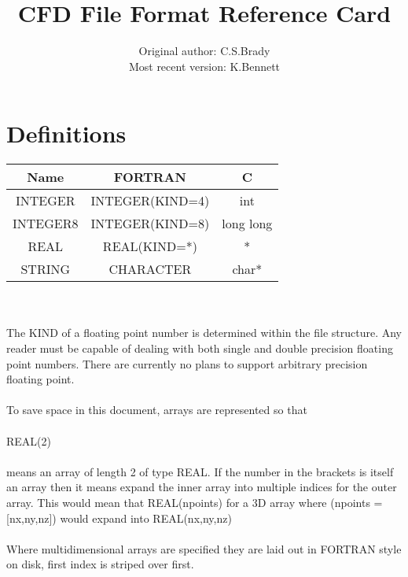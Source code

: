 \documentclass[8pt]{article}
\begin{document}
 

\title{CFD File Format Reference Card}
\author{Original author: C.S.Brady\\Most recent version: K.Bennett}
\maketitle
\section{Definitions}
\begin{tabular}{c | c | c}
Name & FORTRAN & C\\
\hline
INTEGER & INTEGER(KIND=4) & int\\
INTEGER8 & INTEGER(KIND=8)& long long\\
REAL     & REAL(KIND=*)& *\\
STRING   & CHARACTER & char*\\
\end{tabular}\\\\
The KIND of a floating point number is determined within the file structure. Any reader must be capable of dealing with both single and double precision floating point numbers. There are currently no plans to support arbitrary precision floating point.\\\\
To save space in this document, arrays are represented so that\\\\
REAL(2)\\\\
 means an array of length 2 of type REAL. If the number in the brackets is itself an array then it means expand the inner array into multiple indices for the outer array. This would mean that REAL(npoints) for a 3D array where (npoints =[nx,ny,nz]) would expand into REAL(nx,ny,nz)\\\\
 Where multidimensional arrays are specified they are laid out in FORTRAN style on disk, first index is striped over first.\\
\end{document}
